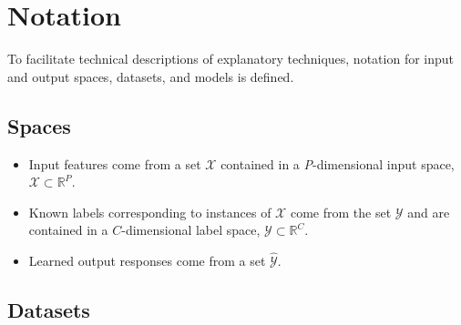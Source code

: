 \documentclass{article}
\begin{document}
\section{Notation} \label{sec:notation}

To facilitate technical descriptions of explanatory techniques, notation for input and output spaces, datasets, and models is defined.

\subsection{Spaces} 
 
	\begin{itemize}
		\item Input features come from a set $\mathcal{X}$ contained in a \textit{P}-dimensional input space, $\mathcal{X} \subset \mathbb{R}^P$.  
		\item Known labels corresponding to instances of $\mathcal{X}$ come from the set $\mathcal{Y}$ and are contained in a $C$-dimensional label space, $\mathcal{Y} \subset \mathbb{R}^C$.
		\item Learned output responses come from a set $\mathcal{\hat{Y}}$. %
	\end{itemize}	
	
\subsection{Datasets} 
\end{document}
